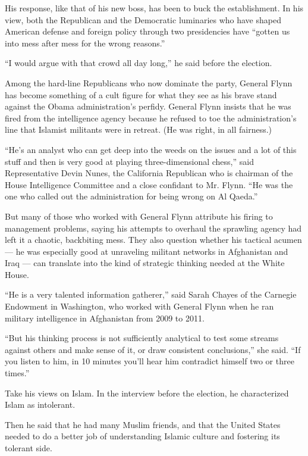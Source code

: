 His response, like that of his new boss, has been to buck the
establishment. In his view, both the Republican and the Democratic
luminaries who have shaped American defense and foreign policy through
two presidencies have ``gotten us into mess after mess for the wrong
reasons.''

``I would argue with that crowd all day long,'' he said before the
election.

Among the hard-line Republicans who now dominate the party, General
Flynn has become something of a cult figure for what they see as his
brave stand against the Obama administration's perfidy. General Flynn
insists that he was fired from the intelligence agency because he
refused to toe the administration's line that Islamist militants were in
retreat. (He was right, in all fairness.)

``He's an analyst who can get deep into the weeds on the issues and a
lot of this stuff and then is very good at playing three-dimensional
chess,'' said Representative Devin Nunes, the California Republican who
is chairman of the House Intelligence Committee and a close confidant to
Mr. Flynn. ``He was the one who called out the administration for being
wrong on Al Qaeda.''

But many of those who worked with General Flynn attribute his firing to
management problems, saying his attempts to overhaul the sprawling
agency had left it a chaotic, backbiting mess. They also question
whether his tactical acumen --- he was especially good at unraveling
militant networks in Afghanistan and Iraq --- can translate into the
kind of strategic thinking needed at the White House.

``He is a very talented information gatherer,'' said Sarah Chayes of the
Carnegie Endowment in Washington, who worked with General Flynn when he
ran military intelligence in Afghanistan from 2009 to 2011.

``But his thinking process is not sufficiently analytical to test some
streams against others and make sense of it, or draw consistent
conclusions,'' she said. ``If you listen to him, in 10 minutes you'll
hear him contradict himself two or three times.''

Take his views on Islam. In the interview before the election, he
characterized Islam as intolerant.

Then he said that he had many Muslim friends, and that the United States
needed to do a better job of understanding Islamic culture and fostering
its tolerant side.

